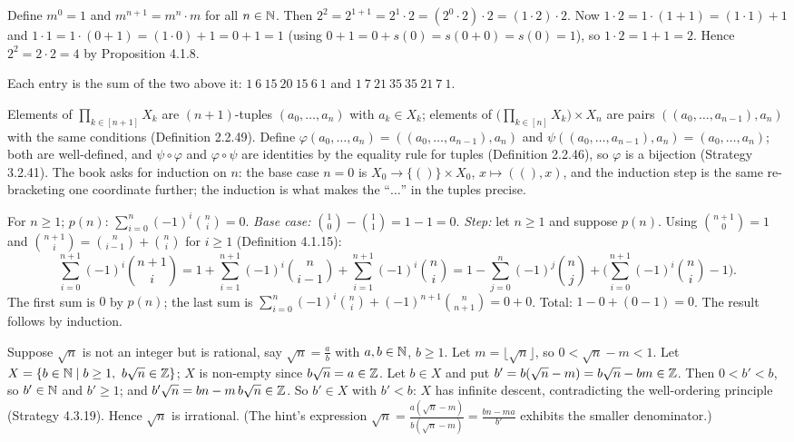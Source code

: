  Define $m^0=1$ and $m^{n+1}=m^n\cdot m$ for all $n\in\mathbb{N}$. Then $2^2=2^{1+1}=2^1\cdot2=(2^0\cdot2)\cdot2=(1\cdot2)\cdot2$. Now $1\cdot2=1\cdot(1+1)=(1\cdot1)+1$ and $1\cdot1=1\cdot(0+1)=(1\cdot0)+1=0+1=1$ (using $0+1=0+s(0)=s(0+0)=s(0)=1$), so $1\cdot2=1+1=2$. Hence $2^2=2\cdot2=4$ by Proposition 4.1.8.

 Each entry is the sum of the two above it: $1\ 6\ 15\ 20\ 15\ 6\ 1$ and $1\ 7\ 21\ 35\ 35\ 21\ 7\ 1$.

 Elements of $\prod_{k\in[n+1]}X_k$ are $(n+1)$-tuples $(a_0,\dots,a_n)$ with $a_k\in X_k$; elements of $\big(\prod_{k\in[n]}X_k\big)\times X_n$ are pairs $((a_0,\dots,a_{n-1}),a_n)$ with the same conditions (Definition 2.2.49). Define $\varphi(a_0,\dots,a_n)=((a_0,\dots,a_{n-1}),a_n)$ and $\psi((a_0,\dots,a_{n-1}),a_n)=(a_0,\dots,a_n)$; both are well-defined, and $\psi\circ\varphi$ and $\varphi\circ\psi$ are identities by the equality rule for tuples (Definition 2.2.46), so $\varphi$ is a bijection (Strategy 3.2.41). The book asks for induction on $n$: the base case $n=0$ is $X_0\to\{()\}\times X_0$, $x\mapsto((),x)$, and the induction step is the same re-bracketing one coordinate further; the induction is what makes the ``$\dots$'' in the tuples precise.

 For $n\ge1$; $p(n)$: $\sum_{i=0}^n(-1)^i\binom ni=0$. \emph{Base case:} $\binom10-\binom11=1-1=0$. \emph{Step:} let $n\ge1$ and suppose $p(n)$. Using $\binom{n+1}0=1$ and $\binom{n+1}i=\binom n{i-1}+\binom ni$ for $i\ge1$ (Definition 4.1.15):
\[
\sum_{i=0}^{n+1}(-1)^i\binom{n+1}i=1+\sum_{i=1}^{n+1}(-1)^i\binom n{i-1}+\sum_{i=1}^{n+1}(-1)^i\binom ni
=1-\sum_{j=0}^n(-1)^j\binom nj+\Big(\sum_{i=0}^{n+1}(-1)^i\binom ni-1\Big).
\]
The first sum is $0$ by $p(n)$; the last sum is $\sum_{i=0}^n(-1)^i\binom ni+(-1)^{n+1}\binom n{n+1}=0+0$. Total: $1-0+(0-1)=0$. The result follows by induction.

 Suppose $\sqrt n$ is not an integer but is rational, say $\sqrt n=\frac ab$ with $a,b\in\mathbb{N}$, $b\ge1$. Let $m=\lfloor\sqrt n\rfloor$, so $0<\sqrt n-m<1$. Let $X=\{b\in\mathbb{N}\mid b\ge1,\ b\sqrt n\in\mathbb{Z}\}$; $X$ is non-empty since $b\sqrt n=a\in\mathbb{Z}$. Let $b\in X$ and put $b'=b(\sqrt n-m)=b\sqrt n-bm\in\mathbb{Z}$. Then $0<b'<b$, so $b'\in\mathbb{N}$ and $b'\ge1$; and $b'\sqrt n=bn-m\,b\sqrt n\in\mathbb{Z}$. So $b'\in X$ with $b'<b$: $X$ has infinite descent, contradicting the well-ordering principle (Strategy 4.3.19). Hence $\sqrt n$ is irrational. (The hint's expression $\sqrt n=\frac{a(\sqrt n-m)}{b(\sqrt n-m)}=\frac{bn-ma}{b'}$ exhibits the smaller denominator.)

